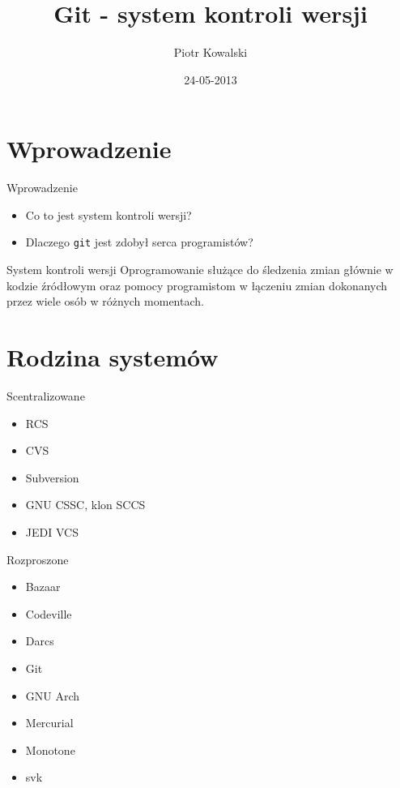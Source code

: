 \documentclass{beamer}
\title[Git]{Git - system kontroli wersji}
\author{Piotr Kowalski}
\institute{Wyższa Szkoła Informatyki Stosowanej i Zarządzania}
\date{24-05-2013}
\begin{document}
	

\begin{frame}
  \titlepage
\end{frame}


\section{Wprowadzenie}

\begin{frame}{Wprowadzenie}
\begin{itemize}
  \item Co to jest system kontroli wersji?
  \item Dlaczego \texttt{git} jest zdobył serca programistów?
\end{itemize}
\vskip 1cm
\begin{block}{System kontroli wersji}
Oprogramowanie służące do śledzenia zmian głównie w kodzie źródłowym oraz pomocy programistom w łączeniu zmian dokonanych przez wiele osób w różnych momentach.
\end{block}
\end{frame}


\section{Rodzina systemów}

\begin{frame}{Scentralizowane}
\begin{itemize}
	\item RCS
	\item CVS
	\item Subversion
	\item GNU CSSC, klon SCCS
	\item JEDI VCS
\end{itemize}
\end{frame}

\begin{frame}{Rozproszone}
\begin{itemize}
	\item Bazaar
	\item Codeville
	\item Darcs
	\item Git
	\item GNU Arch
	\item Mercurial
	\item Monotone
	\item svk
\end{itemize}
\end{frame}
\end{document}
